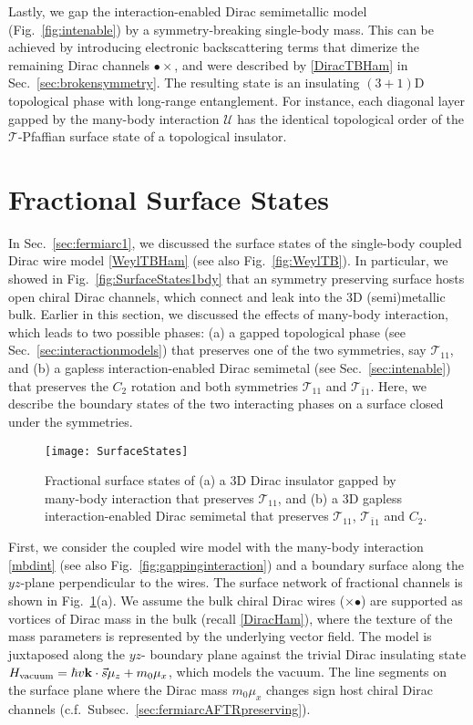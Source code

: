 Lastly, we gap the interaction-enabled Dirac semimetallic model (Fig.~\ref{fig:intenable}) by a symmetry-breaking single-body mass. This can be achieved by introducing electronic backscattering terms that dimerize the remaining Dirac channels {\color{blue}$\bullet\times$}, and were described by \eqref{DiracTBHam} in Sec.~\ref{sec:brokensymmetry}. The resulting state is an insulating $(3+1)$D topological phase with long-range entanglement. For instance, each diagonal layer gapped by the many-body interaction $\mathcal{U}$ has the identical topological order of the $\mathcal{T}$-Pfaffian surface state of a topological insulator. 

\section{Fractional Surface States}\label{sec:fracsurface}



In Sec.~\ref{sec:fermiarc1}, we discussed the surface states of the single-body coupled Dirac wire model \eqref{WeylTBHam} (see also Fig.~\ref{fig:WeylTB}). In particular, we showed in Fig.~\ref{fig:SurfaceStates1bdy} that an \AFTR symmetry preserving surface hosts open chiral Dirac channels, which connect and leak into the 3D (semi)metallic bulk. Earlier in this section, we discussed the effects of many-body interaction, which leads to two possible phases: (a) a gapped topological phase (see Sec.~\ref{sec:interactionmodels}) that preserves one of the two \AFTR symmetries, say $\mathcal{T}_{11}$, and (b) a gapless interaction-enabled Dirac semimetal (see Sec.~\ref{sec:intenable}) that preserves the $C_2$ rotation and both \AFTR symmetries $\mathcal{T}_{11}$ and $\mathcal{T}_{\bar{1}1}$. Here, we describe the boundary states of the two interacting phases on a surface closed under the symmetries.

\begin{figure}[htbp]
	\centering\texttt{[image: SurfaceStates]}
	\caption[Fractional surface states.]{Fractional surface states of (a) a 3D Dirac insulator gapped by many-body interaction that preserves $\mathcal{T}_{11}$, and (b) a 3D gapless interaction-enabled Dirac semimetal that preserves $\mathcal{T}_{11}$, $\mathcal{T}_{\bar{1}1}$ and $C_2$.}\label{fig:SurfaceStates}
\end{figure}

First, we consider the coupled wire model with the many-body interaction \eqref{mbdint} (see also Fig.~\ref{fig:gappinginteraction}) and a boundary surface along the $yz$-plane perpendicular to the wires. The surface network of fractional channels is shown in Fig.~\ref{fig:SurfaceStates}(a). We assume the bulk chiral Dirac wires ({\color{blue}$\times$}{\color{red}$\bullet$}) are supported as vortices of Dirac mass in the bulk (recall \eqref{DiracHam}), where the texture of the mass parameters is represented by the underlying vector field. The model is juxtaposed along the $yz$- boundary plane against the trivial Dirac insulating state $H_{\mathrm{vacuum}}=\hbar v{\bf k}\cdot\vec{s}\mu_z+m_0\mu_x$, which models the vacuum. The line segments on the surface plane where the Dirac mass $m_0\mu_x$ changes sign host chiral Dirac channels (c.f.~Subsec.~\ref{sec:fermiarcAFTRpreserving}).

